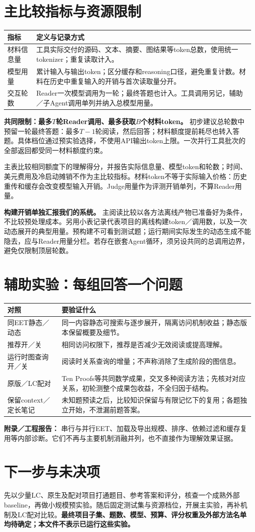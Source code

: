 \documentclass[UTF8,10pt,fontset=none]{ctexart}
\begin{document}
\endgroup
\newpage
\section*{主比较指标与资源限制}
\begin{tabularx}{\textwidth}{@{}p{32mm}Y@{}}
\toprule
指标 & 定义与记录方式 \\
\midrule
材料信息量 & 工具实际交付的源码、文本、摘要、图结果等token总数，使用统一tokenizer；重复读取计入。\\
模型用量 & 累计输入与输出token；区分缓存和reasoning口径，避免重复计数。材料在历史中重复输入的开销与首次读取量分开。\\
交互轮数 & Reader一次模型调用为一轮；最终答题也计入。工具调用另记，辅助／子Agent调用单列并纳入总模型用量。\\
\bottomrule
\end{tabularx}

\textbf{共同限制：最多$T$轮Reader调用、最多获取$B$个材料token。} 初步建议总轮数中预留一轮最终答题：最多$T-1$轮阅读，然后回答；材料额度提前耗尽也转入答题。具体档位通过预实验选择，不使用API输出token上限。一次并行工具批次的全部返回都受同一材料额度约束。

主表比较相同额度下的理解得分，并报告实际信息量、模型token和轮数；时间、美元费用及冷启动摊销不作为主比较指标。材料token不等于实际输入价格：历史重传和缓存会改变模型输入开销。Judge用量作为评测开销单列，不算Reader用量。

\textbf{构建开销单独汇报我们的系统。} 主阅读比较以各方法离线产物已准备好为条件，不比较预处理成本。另用小表记录代表项目的离线构建token／调用数，以及一次动态展开的典型用量。预构建不可看到测试题；运行期间实际发生的动态生成不能隐去，应与Reader用量分栏。若存在嵌套Agent循环，须另设共同的总调用边界，避免仅限制顶层轮数。

\section*{辅助实验：每组回答一个问题}
\begin{tabularx}{\textwidth}{@{}p{33mm}Y@{}}
\toprule
对照 & 要验证什么 \\
\midrule
同EET静态／动态 & 同一内容静态可搜索与逐步展开，隔离访问机制收益；静态版本保留概要及细节。\\
推荐开／关 & 相同访问权限下，推荐是否减少无效阅读或提高理解。\\
运行时图查询开／关 & 阅读时关系查询的增量；不声称消除了生成阶段的图信息。\\
原版／LC配对 & Ten Proofs等共同数学成果，交叉多种阅读方法；先核对对应关系，初轮测整个成果包收益，不全归因于结构。\\
保留context／定长笔记 & 未知题预读之后，比较知识保留与有限记忆下的复用；各题独立开始，不泄漏前题答案。\\
\bottomrule
\end{tabularx}

\textbf{附录／工程报告：} 串行与并行EET、加载及导出规模、排序、依赖过滤和缓存复用等内部诊断。它们不再与主要机制消融并列，也不直接作为理解效果证据。

\section*{下一步与未决项}
先以少量LC、原生及配对项目打通题目、参考答案和评分，核查一个成熟外部baseline，再做小规模预实验。随后固定测试集与资源档位，开展主实验，再补机制及LC配对比较。\textbf{最终项目子集、题数、模型、预算、评分权重及外部方法名单均待确定；本文件不表示已运行这些实验。}
\end{document}
